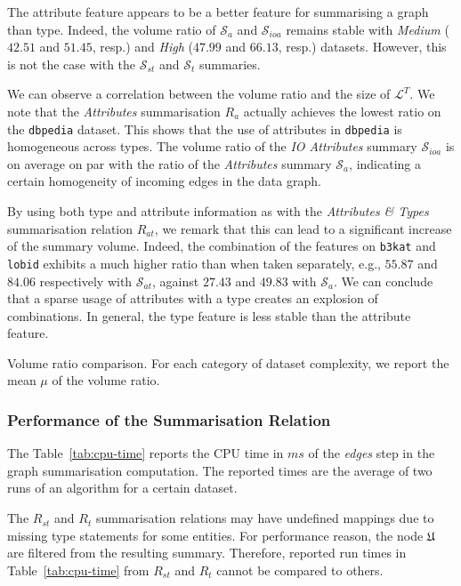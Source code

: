 The attribute feature appears to be a better feature for summarising a graph than type. Indeed, the volume ratio of $\mathcal{S}_a$ and $\mathcal{S}_{ioa}$ remains stable with \emph{Medium} ($42.51$ and $51.45$, resp.) and \emph{High} ($47.99$ and $66.13$, resp.) datasets. However, this is not the case with the $\mathcal{S}_{st}$ and $\mathcal{S}_t$ summaries. 

We can observe a correlation between the volume ratio and the size of $\mathcal{L}^T$.
We note that the \emph{Attributes} summarisation $R_a$ actually achieves the lowest ratio on the \texttt{dbpedia} dataset. This shows that the use of attributes in \texttt{dbpedia} is homogeneous across types. The volume ratio of the \emph{IO Attributes} summary $\mathcal{S}_{ioa}$ is on average on par with the ratio of the \emph{Attributes} summary $\mathcal{S}_a$, indicating a certain homogeneity of incoming edges in the data graph.

By using both type and attribute information as with the \emph{Attributes \& Types} summarisation relation $R_{at}$, we remark that this can lead to a significant increase of the summary volume. Indeed, the combination of the features on \texttt{b3kat} and \texttt{lobid} exhibits a much higher ratio than when taken separately, e.g., $55.87$ and $84.06$ respectively with $\mathcal{S}_{at}$, against $27.43$ and $49.83$ with $\mathcal{S}_a$. We can conclude that a sparse usage of attributes with a type creates an explosion of combinations. In general, the type feature is less stable than the attribute feature.

\begin{table}
	\centering
	
	\caption{Volume ratio comparison. For each category of dataset complexity, we report the mean $\mu$ of the volume ratio.}
	\label{tab:volume-ratio}
\end{table}

\subsubsection{Performance of the Summarisation Relation}

The Table~\ref{tab:cpu-time} reports the CPU time in $ms$ of the \emph{edges} step in the graph summarisation computation. The reported times are the average of two runs of an algorithm for a certain dataset.

The $R_{st}$ and $R_t$ summarisation relations may have undefined mappings due to missing type statements for some entities. For performance reason, the node $\mathfrak{U}$ are filtered from the resulting summary. Therefore, reported run times in Table~\ref{tab:cpu-time} from $R_{st}$ and $R_t$ cannot be compared to others.

